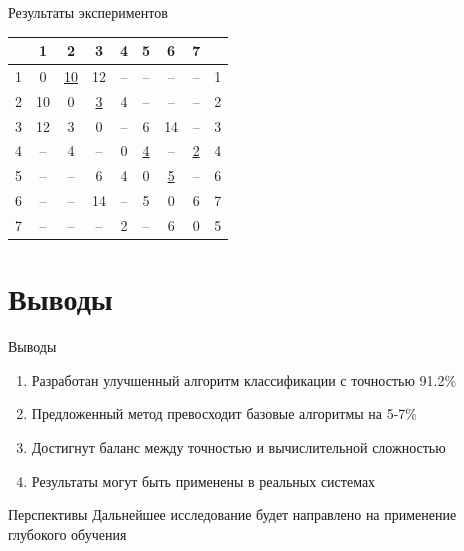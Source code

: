 \documentclass[12pt]{beamer}
\begin{document}
\begin{frame}{Результаты экспериментов}
    \begin{center}
  \begin{tabular}{|c|c|c|c|c|c|c|c|c|}
  \hline
  & 1 & 2 & 3 & 4 & 5 & 6 & 7 & \\
  \hline
  1 & 0 & \underline{10} & 12 & -- &  -- & -- & -- & 1 \\
  \hline
  2 & 10 & 0 & \underline{3} & 4 & -- & -- & -- & 2 \\
  \hline
  3 & 12 & 3 & 0 & -- & 6 & 14 & -- & 3 \\
  \hline
  4 & -- & 4 & -- & 0 & \underline{4} & -- & \underline{2} & 4 \\
  \hline
  5 & -- & -- & 6 & 4 & 0 & \underline{5} & -- & 6 \\
  \hline
  6 & -- & -- & 14 & -- & 5 & 0 & 6 & 7 \\
  \hline
  7 & -- & -- & -- & 2 & -- & 6 & 0 & 5 \\
  \hline
  \end{tabular}
  \end{center}
\end{frame}

\section{Выводы}

\begin{frame}{Выводы}
    \begin{enumerate}
        \item Разработан улучшенный алгоритм классификации с точностью 91.2\%
        \item Предложенный метод превосходит базовые алгоритмы на 5-7\%
        \item Достигнут баланс между точностью и вычислительной сложностью
        \item Результаты могут быть применены в реальных системах
    \end{enumerate}
    
    \vspace{0.5cm}
    
    \begin{block}{Перспективы}
        Дальнейшее исследование будет направлено на применение глубокого обучения
    \end{block}
\end{frame}
\end{document}
